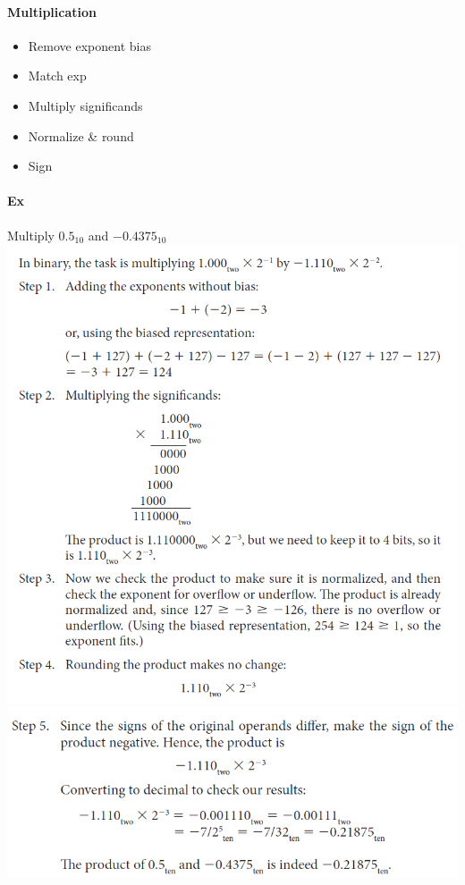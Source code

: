 \documentclass[12 pt]{article}
\begin{document}
	\paragraph{Multiplication}
	\begin{itemize}
		\item Remove exponent bias
		\item Match exp
		\item Multiply significands
		\item Normalize \& round
		\item Sign
	\end{itemize}
	\paragraph{Ex} Multiply $0.5_{10}$ and $-0.4375_{10}$\\
	\includegraphics[scale=0.8]{fpm}
	\\ \includegraphics[scale=0.8]{fpma}
\end{document}
